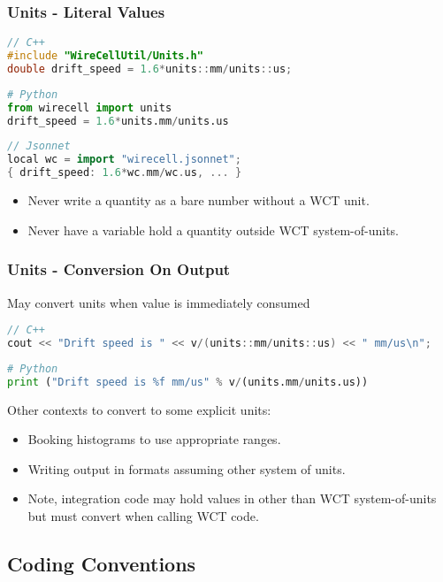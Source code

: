 \documentclass[xcolor=dvipsnames]{beamer}
\begin{document}
\begin{frame}[fragile]
  \frametitle{Units - Literal Values}
\begin{lstlisting}[language=C++]
// C++
#include "WireCellUtil/Units.h" 
double drift_speed = 1.6*units::mm/units::us;
\end{lstlisting}
\begin{lstlisting}[language=python]
# Python
from wirecell import units
drift_speed = 1.6*units.mm/units.us
\end{lstlisting}
\begin{lstlisting}[language=c++]
// Jsonnet
local wc = import "wirecell.jsonnet";
{ drift_speed: 1.6*wc.mm/wc.us, ... }
\end{lstlisting}

\vfill\footnotesize
\begin{itemize}
\item Never write a quantity as a bare number without a WCT unit.
\item Never have a variable hold a quantity outside WCT system-of-units.
\end{itemize}
\end{frame}

\begin{frame}[fragile]
  \frametitle{Units - Conversion On Output}

  May convert units when value is immediately consumed

\begin{lstlisting}[language=c++]
// C++
cout << "Drift speed is " << v/(units::mm/units::us) << " mm/us\n";
\end{lstlisting}
\begin{lstlisting}[language=python]
# Python
print ("Drift speed is %f mm/us" % v/(units.mm/units.us))
\end{lstlisting}

\vfill\footnotesize
  Other contexts to convert to some explicit units:
  \begin{itemize}
  \item Booking histograms to use appropriate ranges.
  \item Writing output in formats assuming other system of units.
  \item Note, integration code may hold values in other than WCT
    system-of-units but must convert when calling WCT code.
  \end{itemize}
\end{frame}

\subsection{Coding Conventions}
\end{document}

